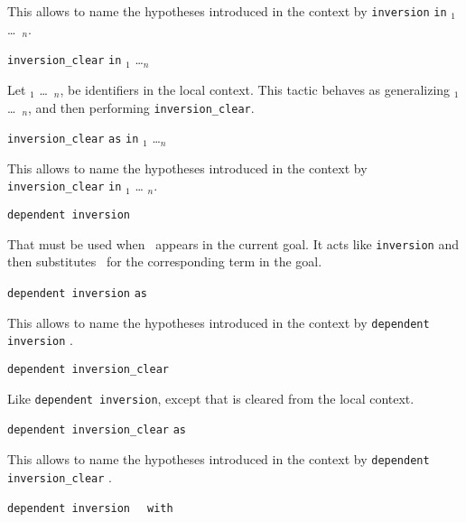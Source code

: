 \begin{coq_example*}
\begin{Variants}
  This allows to name the hypotheses introduced in the context by
  \texttt{inversion} {\ident} \texttt{in} \ident$_1$ \dots\
  \ident$_n$.

\item {} \texttt{inversion\_clear}
  {\ident} \texttt{in} \ident$_1$ \ldots \ident$_n$

  Let \ident$_1$ \dots\ \ident$_n$, be identifiers in the local context. This
  tactic behaves as generalizing \ident$_1$ \dots\ \ident$_n$, and
  then performing {\tt inversion\_clear}.

\item {}
  \texttt{inversion\_clear} {\ident} \texttt{as} {\intropattern}
  \texttt{in} \ident$_1$ \ldots \ident$_n$

  This allows to name the hypotheses introduced in the context by
  \texttt{inversion\_clear} {\ident} \texttt{in} \ident$_1$ \ldots
  \ident$_n$.

\item {} \texttt{dependent inversion}
  {\ident}

  That must be used when \ident\ appears in the current goal.  It acts
  like \texttt{inversion} and then substitutes \ident\ for the
  corresponding term in the goal.

\item {} \texttt{dependent
    inversion} {\ident} \texttt{as} {\intropattern}

  This allows to name the hypotheses introduced in the context by
  \texttt{dependent inversion} {\ident}.

\item {} \texttt{dependent
    inversion\_clear} {\ident}

  Like \texttt{dependent inversion}, except that {\ident} is cleared
  from the local context.

\item {}
  \texttt{dependent inversion\_clear} {\ident}\texttt{as} {\intropattern}

  This allows to name the hypotheses introduced in the context by
  \texttt{dependent inversion\_clear} {\ident}.

\item {} \texttt{dependent
    inversion } {\ident} \texttt{ with } \term


\end{Variants}
\end{coq_example*}
